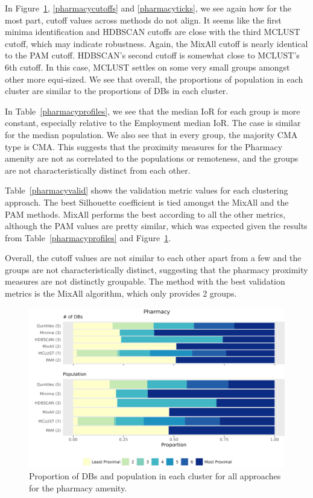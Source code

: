 \documentclass[11pt, a4paper]{article}
\begin{document}
In Figure~\ref{pharmacybarplot}, \ref{pharmacycutoffs} and \ref{pharmacyticks}, we see again how for the most part, cutoff values across methods do not align. It seems like the first minima identification and HDBSCAN cutoffs are close with the third MCLUST cutoff, which may indicate robustness. Again, the MixAll cutoff is nearly identical to the PAM cutoff. HDBSCAN's second cutoff is somewhat close to MCLUST's 6th cutoff. In this case, MCLUST settles on some very small groups amongst other more equi-sized. We see that overall, the proportions of population in each cluster are similar to the proportions of DBs in each cluster.
\par
In Table~\ref{pharmacyprofiles}, we see that the median IoR for each group is more constant, especially relative to the Employment median IoR. The case is similar for the median population. We also see that in every group,  the majority CMA type is CMA. This suggests that the proximity measures for the Pharmacy amenity are not as correlated to the populations or remoteness, and the groups are not characteristically distinct from each other.
\par
Table~\ref{pharmacyvalid} shows the validation metric values for each clustering approach. The best Silhouette coefficient is tied amongst the MixAll and the PAM methods. MixAll performs the best according to all the other metrics, although the PAM values are pretty similar, which was expected given the results from Table~\ref{pharmacyprofiles} and Figure~\ref{pharmacybarplot}.
\par
Overall, the cutoff values are not similar to each other apart from a few and the groups are not characteristically distinct, suggesting that the pharmacy proximity measures are not distinctly groupable. The method with the best validation metrics is the MixAll algorithm, which only provides 2 groups.





\begin{figure}[H]
\centering
\includegraphics[width=\textwidth]{./barplot_comparison/Pharmacy_barplot.png}
\caption[Pharmacy profile barplot]{Proportion of DBs and population in each cluster for all approaches for the pharmacy amenity.}\label{pharmacybarplot}
\end{figure}
\end{document}
